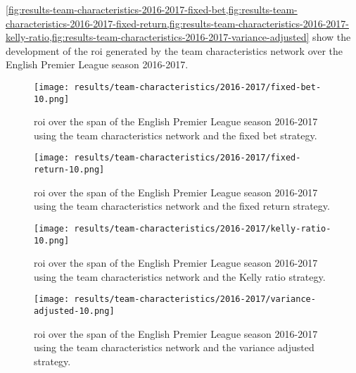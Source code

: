 \cref{fig:results-team-characteristics-2016-2017-fixed-bet,fig:results-team-characteristics-2016-2017-fixed-return,fig:results-team-characteristics-2016-2017-kelly-ratio,fig:results-team-characteristics-2016-2017-variance-adjusted} show the development of the \gls{roi} generated by the team characteristics network over the English Premier League season 2016-2017.
\begin{figure}
    \centering
    \texttt{[image: results/team-characteristics/2016-2017/fixed-bet-10.png]}
    \caption{\gls{roi} over the span of the English Premier League season 2016-2017 using the team characteristics network and the fixed bet strategy.}
    \label{fig:results-team-characteristics-2016-2017-fixed-bet}
\end{figure}
\begin{figure}
    \centering
    \texttt{[image: results/team-characteristics/2016-2017/fixed-return-10.png]}
    \caption{\gls{roi} over the span of the English Premier League season 2016-2017 using the team characteristics network and the fixed return strategy.}
    \label{fig:results-team-characteristics-2016-2017-fixed-return}
\end{figure}
\begin{figure}
    \centering
    \texttt{[image: results/team-characteristics/2016-2017/kelly-ratio-10.png]}
    \caption{\gls{roi} over the span of the English Premier League season 2016-2017 using the team characteristics network and the Kelly ratio strategy.}
    \label{fig:results-team-characteristics-2016-2017-kelly-ratio}
\end{figure}
\begin{figure}
    \centering
    \texttt{[image: results/team-characteristics/2016-2017/variance-adjusted-10.png]}
    \caption{\gls{roi} over the span of the English Premier League season 2016-2017 using the team characteristics network and the variance adjusted strategy.}
    \label{fig:results-team-characteristics-2016-2017-variance-adjusted}
\end{figure}

